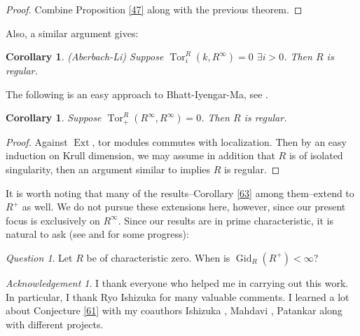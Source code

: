 \documentclass[11pt,a4paper]{amsart}
\numberwithin{equation}{section}
\newtheorem{corollary}[theorem]{Corollary}
\theoremstyle{definition}
\theoremstyle{remark}
\newtheorem{question}[theorem]{Question}\newtheorem{discussion}[theorem]{Discussion}
\newtheorem{acknowledgement}{Acknowledgement}
\newcommand{\Ext}{\operatorname{Ext}}
\begin{document}
\begin{proof}
	Combine {Proposition} \ref{47} along with the previous theorem.
\end{proof}
Also, a similar argument  gives:

 \begin{corollary}(Aberbach-Li)
	Suppose 	\(
	\operatorname{Tor}^{R}_{i}(k,R^\infty)=0\)   $\exists i>0$.
	Then 	$R$ is regular.
\end{corollary}

The following is an easy approach to  Bhatt-Iyengar-Ma, see \cite{bim}. 
\begin{corollary}\label{63a}
	Suppose 	\(
	\operatorname{Tor}_{+}^{R}(R^\infty,R^\infty)=0\).
	Then 	$R$ is regular.
\end{corollary}


\begin{proof}
Against $\Ext$, tor modules commutes with localization. Then by an easy
induction on Krull dimension, we may assume in addition that $R$ is of isolated singularity, then an argument  similar to \cite[Theorem 3.15(4)]{Ryo} implies	$R$ is regular.
\end{proof}
It is worth noting that many of the results--Corollary \ref{63} among them--extend to 
$R^+$ as well. We do not pursue these extensions here, however, since our present focus is exclusively on 
$R^\infty$. Since our results are in prime characteristic, it is natural to ask (see \cite{MPa} and \cite{Ryo} for some progress):
\begin{question}Let $R$ be of characteristic zero.  When is $\operatorname{Gid}_R(R^+) < \infty$?
\end{question}
\begin{acknowledgement}
I thank everyone who helped me in carrying out this work. In particular, I thank Ryo Ishizuka for many valuable comments. I learned a lot about {Conjecture} \ref{61} with my coauthors Ishizuka \cite{Ryo}, Mahdavi \cite{Elham}, Patankar \cite{MPa} along with different projects. 
\end{acknowledgement}
\maketitle
\end{document}
